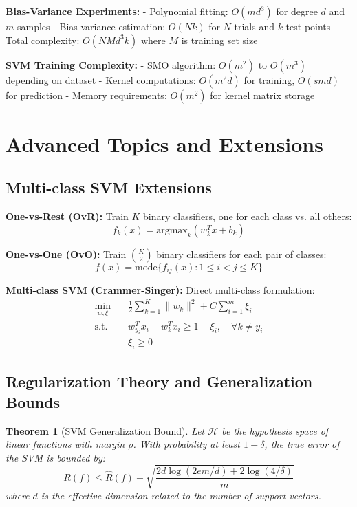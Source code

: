 \documentclass[12pt, a4paper]{article}
\newtheorem{theorem}{Theorem}
\begin{document}
\textbf{Bias-Variance Experiments:}
- Polynomial fitting: $O(md^3)$ for degree $d$ and $m$ samples
- Bias-variance estimation: $O(Nk)$ for $N$ trials and $k$ test points
- Total complexity: $O(NMd^3k)$ where $M$ is training set size

\textbf{SVM Training Complexity:}
- SMO algorithm: $O(m^2)$ to $O(m^3)$ depending on dataset
- Kernel computations: $O(m^2d)$ for training, $O(smd)$ for prediction
- Memory requirements: $O(m^2)$ for kernel matrix storage

\section{Advanced Topics and Extensions}

\subsection{Multi-class SVM Extensions}

\textbf{One-vs-Rest (OvR):}
Train $K$ binary classifiers, one for each class vs. all others:
\begin{equation}
f_k(x) = \text{argmax}_{k} (w_k^T x + b_k)
\end{equation}

\textbf{One-vs-One (OvO):}
Train $\binom{K}{2}$ binary classifiers for each pair of classes:
\begin{equation}
f(x) = \text{mode}\{f_{ij}(x) : 1 \leq i < j \leq K\}
\end{equation}

\textbf{Multi-class SVM (Crammer-Singer):}
Direct multi-class formulation:
\begin{align}
\min_{w,\xi} &\quad \frac{1}{2}\sum_{k=1}^K \|w_k\|^2 + C\sum_{i=1}^m \xi_i \\
\text{s.t.} &\quad w_{y_i}^T x_i - w_k^T x_i \geq 1 - \xi_i, \quad \forall k \neq y_i \\
&\quad \xi_i \geq 0
\end{align}

\subsection{Regularization Theory and Generalization Bounds}

\begin{theorem}[SVM Generalization Bound]
Let $\mathcal{H}$ be the hypothesis space of linear functions with margin $\rho$. With probability at least $1-\delta$, the true error of the SVM is bounded by:
\begin{equation}
R(f) \leq \hat{R}(f) + \sqrt{\frac{2d \log(2em/d) + 2\log(4/\delta)}{m}}
\end{equation}
where $d$ is the effective dimension related to the number of support vectors.
\end{theorem}
\end{document}
